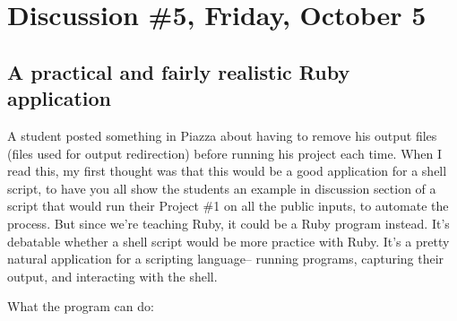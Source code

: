 \documentclass[12pt]{article}
\begin{document}

  \section{Discussion \#5, Friday, October 5}

    \subsection{A practical and fairly realistic Ruby application}

      A student posted something in Piazza about having to remove his output
    files (files used for output redirection) before running his project
    each time.  When I read this, my first thought was that this would be a
    good application for a shell script, to have you all show the students
    an example in discussion section of a script that would run their
    Project \#1 on all the public inputs, to automate the process.  But
    since we're teaching Ruby, it could be a Ruby program instead.  It's
    debatable whether a shell script would be more practice with Ruby.  It's
    a pretty natural application for a scripting language-- running
    programs, capturing their output, and interacting with the shell.

      What the program can do:

      \vspace{-2mm}
\end{document}
